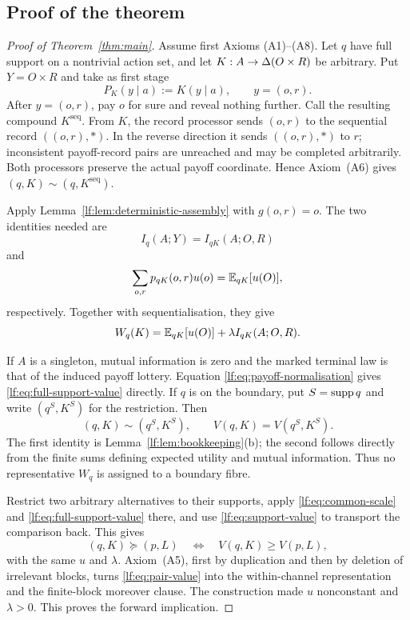 \subsection{Proof of the theorem}

\begin{proof}[Proof of Theorem~\ref{thm:main}]
Assume first Axioms \textup{(A1)--(A8)}.  Let $q$ have full support on a
nontrivial action set, and let $K:A\to\Delta(O\times R)$ be arbitrary.  Put
$Y=O\times R$ and take as first stage
\[
P_K(y\mid a):=K(y\mid a),
\qquad y=(o,r).
\]
After $y=(o,r)$, pay $o$ for sure and reveal nothing further.  Call the
resulting compound $K^{\mathrm{seq}}$.  From $K$, the record processor sends
$(o,r)$ to the sequential record $((o,r),\ast)$.  In the reverse direction it
sends $((o,r),\ast)$ to $r$; inconsistent payoff-record pairs are unreached and
may be completed arbitrarily.  Both processors preserve the actual payoff
coordinate.  Hence Axiom~\textup{(A6)} gives
$(q,K)\sim(q,K^{\mathrm{seq}})$.

\begin{samepage}
Apply Lemma~\ref{lf:lem:deterministic-assembly} with $g(o,r)=o$.  The two
identities needed are
\[
I_q(A;Y)=I_{qK}(A;O,R)
\]
and
\[
\sum_{o,r}p_{qK}(o,r)u(o)=\mathbb E_{qK}[u(O)],
\]
respectively.  Together with sequentialisation, they give
\begin{equation}
W_q(K)=\mathbb E_{qK}[u(O)]+\lambda I_{qK}(A;O,R).
\label{lf:eq:full-support-value}
\end{equation}
\end{samepage}

If $A$ is a singleton, mutual information is zero and the marked terminal law
is that of the induced payoff lottery.  Equation
\eqref{lf:eq:payoff-normalisation} gives
\eqref{lf:eq:full-support-value} directly.  If $q$ is on the boundary, put
$S=\operatorname{supp} q$ and write $(q^S,K^S)$ for the restriction.  Then
\begin{equation}
(q,K)\sim(q^S,K^S),
\qquad
V(q,K)=V(q^S,K^S).
\label{lf:eq:support-value}
\end{equation}
The first identity is Lemma~\ref{lf:lem:bookkeeping}\textup{(b)}; the second
follows directly from the finite sums defining expected utility and mutual
information.  Thus no representative $W_q$ is assigned to a boundary fibre.

Restrict two arbitrary alternatives to their supports, apply
\eqref{lf:eq:common-scale} and \eqref{lf:eq:full-support-value} there, and use
\eqref{lf:eq:support-value} to transport the comparison back.  This gives
\begin{equation}
(q,K)\succeq(p,L)
\quad\Longleftrightarrow\quad
V(q,K)\ge V(p,L),
\label{lf:eq:pair-value}
\end{equation}
with the same $u$ and $\lambda$.  Axiom~\textup{(A5)}, first by duplication and
then by deletion of irrelevant blocks, turns \eqref{lf:eq:pair-value} into the
within-channel representation and the finite-block moreover clause.  The
construction made $u$ nonconstant and $\lambda>0$.  This proves the forward
implication.


\end{proof}
